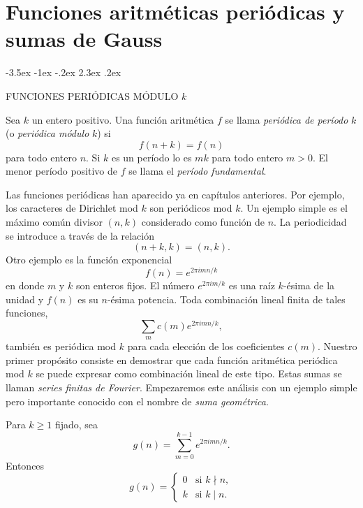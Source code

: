 \documentclass[12pt,a4paper]{book}
\makeatletter
\renewcommand\section{\@startsection{section}{1}{\z@}%
  {-3.5ex \@plus -1ex \@minus -.2ex}%
  {2.3ex \@plus .2ex}%
  {\normalfont\Large\bfseries\raggedright}}
\makeatother
\begin{document}
\chapter{Funciones aritméticas periódicas y sumas de Gauss}

    \section{FUNCIONES PERIÓDICAS MÓDULO \texorpdfstring{$k$}{k}}

    Sea $k$ un entero positivo. Una función aritmética $f$ se llama \textit{periódica de
    período} $k$ (o \textit{periódica módulo} $k$) si
    \begin{equation*}
        f(n+k)=f(n)
    \end{equation*}
    para todo entero $n$. Si $k$ es un período lo es $mk$ para todo entero $m>0$. El menor
    período positivo de $f$ se llama el \textit{período fundamental}.

    Las funciones periódicas han aparecido ya en capítulos anteriores. Por ejemplo, los
    caracteres de Dirichlet mod $k$ son periódicos mod $k$. Un ejemplo simple es el máximo
    común divisor $(n,k)$ considerado como función de $n$. La periodicidad se introduce a
    través de la relación
    \begin{equation*}
        (n+k,k)=(n,k).
    \end{equation*}
    Otro ejemplo es la función exponencial
    \begin{equation*}
        f(n)=e^{2\pi imn/k}
    \end{equation*}
    en donde $m$ y $k$ son enteros fijos. El número $e^{2\pi im/k}$ es una raíz $k$-ésima de
    la unidad y $f(n)$ es su $n$-ésima potencia. Toda combinación lineal finita de tales
    funciones,
    \begin{equation*}
        \sum_{m}c(m)e^{2\pi imn/k},
    \end{equation*}
    también es periódica mod $k$ para cada elección de los coeficientes $c(m)$. Nuestro
    primer propósito consiste en demostrar que cada función aritmética periódica mod $k$ se
    puede expresar como combinación lineal de este tipo. Estas sumas se llaman
    \textit{series finitas de Fourier}. Empezaremos este análisis con un ejemplo simple pero
    importante conocido con el nombre de \textit{suma geométrica}.

    \begin{teorema}
        Para $k\geq1$ fijado, sea
        \begin{equation*}
            g(n)=\sum_{m=0}^{k-1}e^{2\pi imn/k}.
        \end{equation*}
        Entonces
        \begin{equation*}
            g(n)=
            \begin{cases}
                0&\text{si }k\nmid n,\\
                k&\text{si }k\mid n.
            \end{cases}
        \end{equation*}
    \end{teorema}
\end{document}
